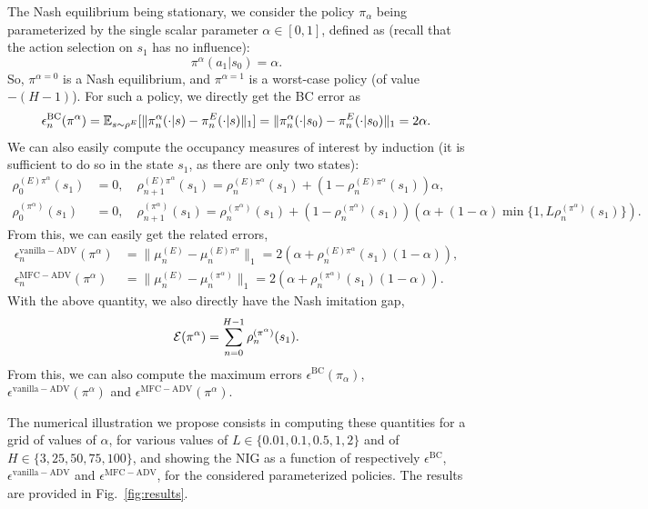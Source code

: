 \documentclass{article}
\begin{document}
The Nash equilibrium being stationary, we consider the policy $\pi_\alpha$ being parameterized by the single scalar parameter $\alpha\in[0,1]$, defined as (recall that the action selection on $s_1$ has no influence):
\begin{equation}
    \pi^\alpha(a_1|s_0) = \alpha.
\end{equation}
So, $\pi^{\alpha=0}$ is a Nash equilibrium, and $\pi^{\alpha=1}$ is a worst-case policy (of value $-(H-1)$). For such a policy, we directly get the BC error as
\begin{equation}
    \epsilon_n^\mathrm{BC}(\pi^\alpha) = \mathbb{E}_{s\sim\rho^{E}}[\|\pi^\alpha_n(\cdot|s) - \pi^E_n(\cdot|s)\|_1] = \|\pi^\alpha_n(\cdot|s_0) - \pi^E_n(\cdot|s_0)\|_1 = 2 \alpha. 
\end{equation}
We can also easily compute the occupancy measures of interest by induction (it is sufficient to do so in the state $s_1$, as there are only two states):
\begin{align}
    \rho_0^{(E)\pi^\alpha}(s_1) &= 0, \quad \rho_{n+1}^{(E)\pi^\alpha}(s_1) = \rho_{n}^{(E)\pi^\alpha}(s_1) + (1-\rho_{n}^{(E)\pi^\alpha}(s_1))\alpha,
    \\
    \rho_0^{(\pi^\alpha)}(s_1) &= 0, \quad 
    \rho_{n+1}^{(\pi^\alpha)}(s_1) = \rho_n^{(\pi^\alpha)}(s_1) + (1-\rho_n^{(\pi^\alpha)}(s_1))(\alpha + (1-\alpha)\min\{1, L \rho_n^{(\pi^\alpha)}(s_1)\}).
\end{align}
From this, we can easily get the related errors,
\begin{align}
    \epsilon_n^\mathrm{vanilla-ADV}(\pi^\alpha) &= \| \mu_n^{(E)} - \mu_n^{(E)\pi^\alpha}\|_1 = 2(\alpha + \rho_{n}^{(E)\pi^\alpha}(s_1)(1-\alpha) ),
    \\
    \epsilon_n^\mathrm{MFC-ADV}(\pi^\alpha) &= \| \mu_n^{(E)} - \mu_n^{(\pi^\alpha)}\|_1 = 2(\alpha + \rho_{n}^{(\pi^\alpha)}(s_1)(1-\alpha) ).
\end{align}
With the above quantity, we also directly have the Nash imitation gap,
\begin{equation}
    \mathcal{E}(\pi^\alpha) = \sum_{n=0}^{H-1} \rho_{n}^{(\pi^\alpha)}(s_1).
\end{equation}
From this, we can also compute the maximum errors $\epsilon^\mathrm{BC}(\pi_\alpha)$, $\epsilon^\mathrm{vanilla-ADV}(\pi^\alpha)$ and $\epsilon^\mathrm{MFC-ADV}(\pi^\alpha)$.

The numerical illustration we propose consists in computing these quantities for a grid of values of $\alpha$, for various values of $L \in\{0.01, 0.1, 0.5, 1, 2\}$ and of $H\in\{3, 25, 50, 75, 100\}$, and showing the NIG as a function of respectively $\epsilon^\mathrm{BC}$, $\epsilon^\mathrm{vanilla-ADV}$ and $\epsilon^\mathrm{MFC-ADV}$, for the considered parameterized policies. The results are provided in Fig.~\ref{fig:results}. 
\end{document}
